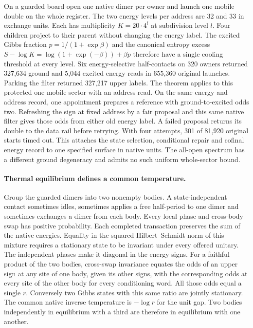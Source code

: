 \documentclass[11pt]{article}
\theoremstyle{remark}
\theoremstyle{plain}
\begin{document}
On a guarded board open one native dimer per owner and launch one mobile
double on the whole register. The two energy levels per address are 32
and 33 in exchange units. Each has multiplicity $K=20\cdot4^l$ at
subdivision level $l$. Four children project to their parent without
changing the energy label. The excited Gibbs fraction
$p=1/(1+\exp\beta)$ and the canonical entropy excess
$S-\log K=\log(1+\exp(-\beta))+\beta p$ therefore have a single
cooling threshold at every level. Six energy-selective half-contacts on
320 owners returned 327,634 ground and 5,044 excited energy reads in
655,360 original launches. Parking the filter returned 327,217 upper
labels. The theorem applies to this protected one-mobile sector with
an address read. On the same energy-and-address record, one appointment
prepares a reference with ground-to-excited odds two. Refreshing the sign
at fixed address by a fair proposal and this same native filter gives
those odds from either old energy label. A failed proposal returns its
double to the data rail before retrying. With four attempts, 301 of
81,920 original starts timed out. This attaches the state selection,
conditional repair and cofinal energy record to one specified surface
in native units. The all-open spectrum has a different ground degeneracy
and admits no such uniform whole-sector bound.

\paragraph{Thermal equilibrium defines a common temperature.}
Group the guarded dimers into two nonempty bodies. A state-independent
contact sometimes idles, sometimes applies a free half-period to one
dimer and sometimes exchanges a dimer from each body. Every local phase
and cross-body swap has positive probability. Each completed transaction
preserves the sum of the native energies. Equality in the squared
Hilbert--Schmidt norm of this mixture requires a stationary state to be
invariant under every offered unitary. The independent phases make it
diagonal in the energy signs. For a faithful product of the two bodies,
cross-swap invariance equates the odds of an upper sign at any site of one
body, given its other signs, with the corresponding odds at every site
of the other body for every conditioning word. All those odds equal a
single $r$. Conversely two Gibbs states with this same ratio are jointly
stationary. The common native inverse temperature is $-\log r$ for the
unit gap. Two bodies independently in equilibrium with a third are
therefore in equilibrium with one another.
\end{document}
